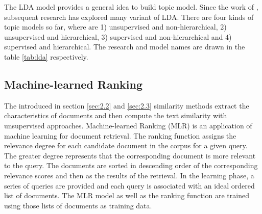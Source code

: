 The LDA model provides a general idea to build topic model. Since the work of \cite{Blei:2003}, subsequent research has explored many variant of LDA. There are four kinds of topic models so far, where are 1) unsupervised and non-hierarchical, 2) unsupervised and hierarchical, 3) supervised and non-hierarchical and 4) supervised and hierarchical. The research and model names are drawn in the table \ref{tab:lda} respectively.

\begin{table}[!htb]
\centering
{}
\caption{Topic Models Variant of LDA}
\label{tab:lda}
\end{table}

\subsection{Machine-learned Ranking}
\label{sec:2.4}

The introduced in section \ref{sec:2.2} and \ref{sec:2.3} similarity methods extract the characteristics of documents and then compute the text similarity with unsupervised approaches. Machine-learned Ranking (MLR) is an application of machine learning for document retrieval. The ranking function assigns the relevance degree for each candidate document in the corpus for a given query. The greater degree represents that the corresponding document is more relevant to the query. The documents are sorted in descending order of the corresponding relevance scores and then as the results of the retrieval. In the learning phase, a series of queries are provided and each query is associated with an ideal ordered list of documents. The MLR model as well as the ranking function are trained using those lists of documents as training data. 

